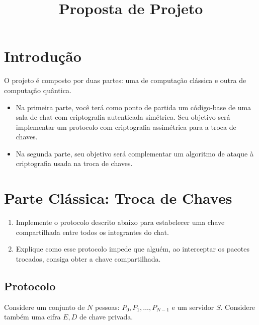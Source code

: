 \documentclass[a4paper,12pt]{article}
\begin{document}
\title{Proposta de Projeto}
\author{}
\date{}
\maketitle

\section*{Introdução}

O projeto é composto por duas partes: uma de computação clássica e outra de computação quântica. 
\begin{itemize}
    \item Na primeira parte, você terá como ponto de partida um código-base de uma sala de chat com criptografia autenticada simétrica. Seu objetivo será implementar um protocolo com criptografia assimétrica para a troca de chaves.
    \item Na segunda parte, seu objetivo será complementar um algoritmo de ataque à criptografia usada na troca de chaves.
\end{itemize}

\section{Parte Clássica: Troca de Chaves}

\begin{enumerate}
    \item Implemente o protocolo descrito abaixo para estabelecer uma chave compartilhada entre todos os integrantes do chat. 
    \item Explique como esse protocolo impede que alguém, ao interceptar os pacotes trocados, consiga obter a chave compartilhada.
\end{enumerate}
\subsection*{Protocolo}
Considere um conjunto de \( N \) pessoas: \( P_0, P_1, \dots, P_{N-1} \) e um servidor \( S \). Considere também uma cifra \( E, D \) de chave privada.
\end{document}
